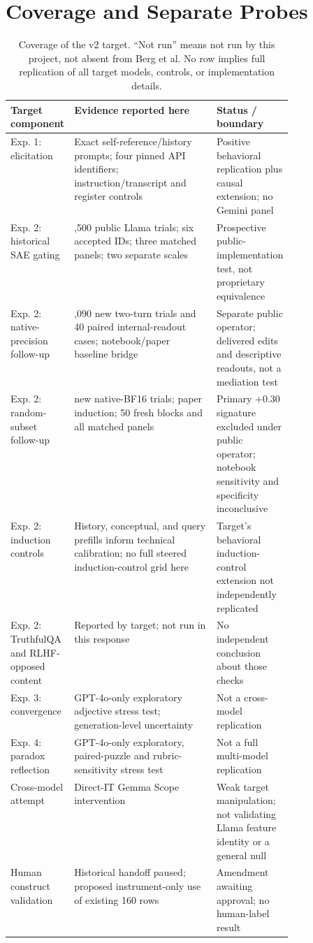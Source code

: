\documentclass[11pt]{article}
\begin{document}
\section{Coverage and Separate Probes}\label{app:secondary}

\begin{table}[htbp]
\centering\small
\caption{Coverage of the v2 target. ``Not run'' means not run by this project,
not absent from Berg et al. No row implies full replication of all target
models, controls, or implementation details.}
\label{tab:coverage}
\begin{tabularx}{\linewidth}{@{}>{\raggedright\arraybackslash}p{0.21\linewidth}>{\raggedright\arraybackslash}X>{\raggedright\arraybackslash}p{0.26\linewidth}@{}}
\toprule
Target component & Evidence reported here & Status / boundary\\
\midrule
Exp. 1: elicitation & Exact self-reference/history prompts; four pinned API
identifiers; instruction/transcript and register controls & Positive behavioral
replication plus causal extension; no Gemini panel\\
Exp. 2: historical SAE gating & 1,500 public Llama trials; six accepted IDs; three
matched panels; two separate scales & Prospective public-implementation
test, not proprietary equivalence\\
Exp. 2: native-precision follow-up & 1,090 new two-turn trials and 40 paired
internal-readout cases; notebook/paper baseline bridge & Separate public
operator; delivered edits and descriptive readouts, not a mediation test\\
Exp. 2: random-subset follow-up & 450 new native-BF16 trials; paper induction;
50 fresh blocks and all matched panels & Primary +0.30 signature excluded
under public operator; notebook sensitivity and specificity inconclusive\\
Exp. 2: induction controls & History, conceptual, and query prefills inform
technical calibration; no full steered induction-control grid here & Target's
behavioral induction-control extension not independently replicated\\
Exp. 2: TruthfulQA and RLHF-opposed content & Reported by target; not run in
this response & No independent conclusion about those checks\\
Exp. 3: convergence & GPT-4o-only exploratory adjective stress test;
generation-level uncertainty & Not a cross-model replication\\
Exp. 4: paradox reflection & GPT-4o-only exploratory, paired-puzzle and
rubric-sensitivity stress test & Not a full multi-model replication\\
Cross-model attempt & Direct-IT Gemma Scope intervention & Weak target
manipulation; not validating Llama feature identity or a general null\\
Human construct validation & Historical handoff paused; proposed instrument-only
use of existing 160 rows & Amendment awaiting approval; no human-label result\\
\bottomrule
\end{tabularx}
\end{table}
\end{document}
